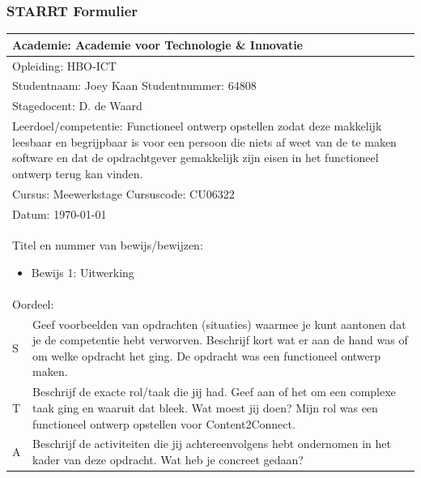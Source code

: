 \subsubsection{STARRT Formulier}
\begin{tabularx}{\textwidth}{| l | X |}
\hline
\multicolumn{2}{|l|}{Academie: Academie voor Technologie \& Innovatie } \\
\hline
\multicolumn{2}{|l|}{Opleiding: HBO-ICT } \\
\hline
\multicolumn{2}{|l|}{Studentnaam: Joey Kaan \hspace{35pt} Studentnummer: 64808} \\
\hline
\multicolumn{2}{|l|}{Stagedocent: D. de Waard} \\
\hline
\multicolumn{2}{|p{\textwidth-1in}|}{Leerdoel/competentie: Functioneel ontwerp opstellen zodat deze makkelijk leesbaar en begrijpbaar is voor een persoon die niets af weet van de te maken software en dat de opdrachtgever gemakkelijk zijn eisen in het functioneel ontwerp terug kan vinden.} \\
\hline
\multicolumn{2}{|l|}{Cursus: Meewerkstage \hspace{35pt} Cursuscode: CU06322} \\
\hline
\multicolumn{2}{|l|}{Datum: \today} \\
\hline
\multicolumn{2}{|l|}{
\begin{minipage}{0.9\columnwidth}
Titel en nummer van bewijs/bewijzen:
\begin{itemize}
\item Bewijs 1: Uitwerking
\end{itemize}
\end{minipage}
} \\ [50pt]
\hline
\multicolumn{2}{|l|}{Oordeel: } \\
\hline
S & Geef voorbeelden van opdrachten (situaties) waarmee je kunt aantonen dat je de competentie hebt verworven. Beschrijf kort wat er aan de hand was of om welke opdracht het ging.
\newline
\newline
De opdracht was een functioneel ontwerp maken. \\
\hline
T & Beschrijf de exacte rol/taak die jij had. Geef aan of het om een complexe taak ging en waaruit dat bleek. Wat moest jij doen?
\newline
\newline
Mijn rol was een functioneel ontwerp opstellen voor Content2Connect.
\\
\hline
A & Beschrijf de activiteiten die jij achtereenvolgens hebt ondernomen in het kader van deze opdracht. Wat heb je concreet gedaan?

\end{tabularx}
